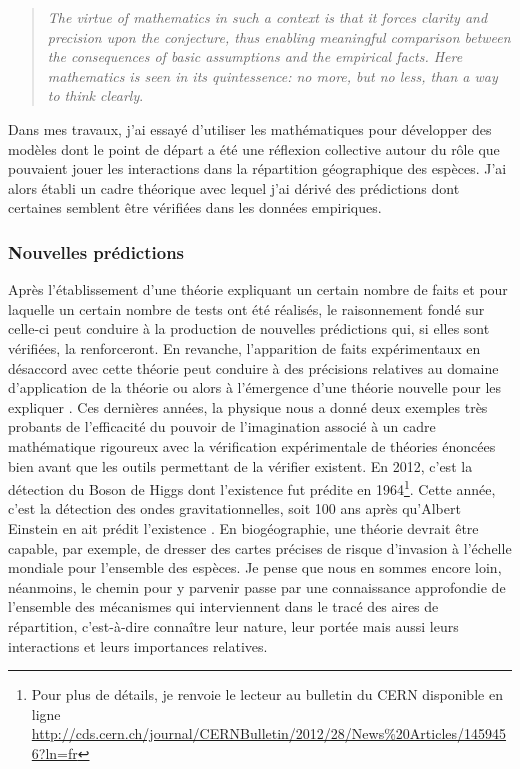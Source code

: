 \begin{quote}
\emph{The virtue of mathematics in such a context is that it forces
clarity and precision upon the conjecture, thus enabling meaningful
comparison between the consequences of basic assumptions and the
empirical facts. Here mathematics is seen in its quintessence: no more,
but no less, than a way to think clearly}.
\end{quote}

Dans mes travaux, j'ai essayé d'utiliser les mathématiques pour
développer des modèles dont le point de départ a été une réflexion
collective autour du rôle que pouvaient jouer les interactions dans la
répartition géographique des espèces. J'ai alors établi un cadre
théorique avec lequel j'ai dérivé des prédictions dont certaines
semblent être vérifiées dans les données empiriques.

\subsubsection*{Nouvelles prédictions}\label{nouvelles-pruxe9dictions}

Après l'établissement d'une théorie expliquant un certain nombre de
faits et pour laquelle un certain nombre de tests ont été réalisés, le
raisonnement fondé sur celle-ci peut conduire à la production de
nouvelles prédictions qui, si elles sont vérifiées, la renforceront. En
revanche, l'apparition de faits expérimentaux en désaccord avec cette
théorie peut conduire à des précisions relatives au domaine
d'application de la théorie ou alors à l'émergence d'une théorie
nouvelle pour les expliquer \citep{Popper1959}. Ces dernières années, la
physique nous a donné deux exemples très probants de l'efficacité du
pouvoir de l'imagination associé à un cadre mathématique rigoureux avec
la vérification expérimentale de théories énoncées bien avant que les
outils permettant de la vérifier existent. En 2012, c'est la détection
du Boson de Higgs dont l'existence fut prédite en 1964\footnote{Pour
  plus de détails, je renvoie le lecteur au bulletin du CERN disponible
  en ligne
  \url{http://cds.cern.ch/journal/CERNBulletin/2012/28/News\%20Articles/1459456?ln=fr}}.
Cette année, c'est la détection des ondes gravitationnelles, soit 100
ans après qu'Albert Einstein en ait prédit l'existence
\citep{Waldrop2016}. En biogéographie, une théorie devrait être capable,
par exemple, de dresser des cartes précises de risque d'invasion à
l'échelle mondiale pour l'ensemble des espèces. Je pense que nous en
sommes encore loin, néanmoins, le chemin pour y parvenir passe par une
connaissance approfondie de l'ensemble des mécanismes qui interviennent
dans le tracé des aires de répartition, c'est-à-dire connaître leur
nature, leur portée mais aussi leurs interactions et leurs importances
relatives.

